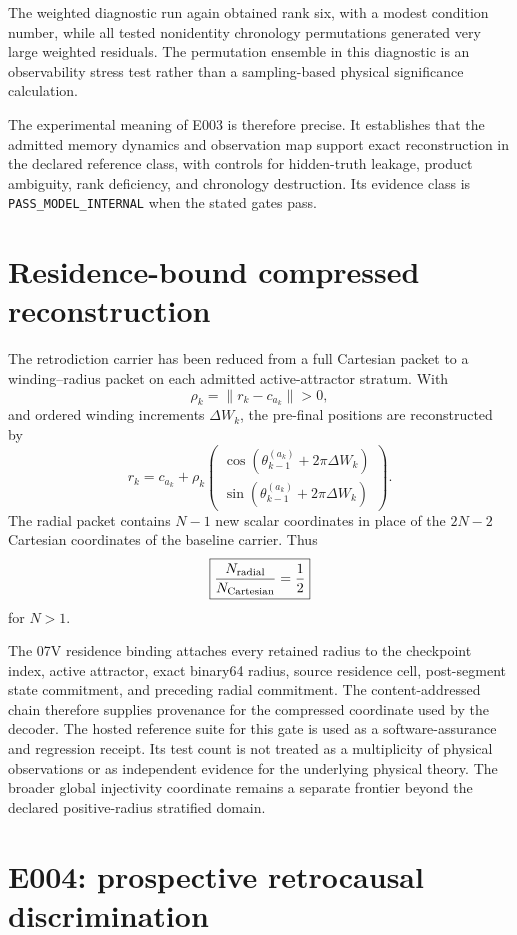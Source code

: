 \documentclass[11pt]{book}
\begin{document}
The weighted diagnostic run again obtained rank six, with a modest condition number, while all tested nonidentity chronology permutations generated very large weighted residuals. The permutation ensemble in this diagnostic is an observability stress test rather than a sampling-based physical significance calculation.

The experimental meaning of E003 is therefore precise. It establishes that the admitted memory dynamics and observation map support exact reconstruction in the declared reference class, with controls for hidden-truth leakage, product ambiguity, rank deficiency, and chronology destruction. Its evidence class is \texttt{PASS\_MODEL\_INTERNAL} when the stated gates pass.

\section{Residence-bound compressed reconstruction}

The retrodiction carrier has been reduced from a full Cartesian packet to a winding--radius packet on each admitted active-attractor stratum. With
\[
\rho_k=\|r_k-c_{a_k}\|>0,
\]
and ordered winding increments \(\Delta W_k\), the pre-final positions are reconstructed by
\[
r_k=c_{a_k}+\rho_k
\begin{pmatrix}
\cos(\theta_{k-1}^{(a_k)}+2\pi\Delta W_k)\\
\sin(\theta_{k-1}^{(a_k)}+2\pi\Delta W_k)
\end{pmatrix}.
\]
The radial packet contains \(N-1\) new scalar coordinates in place of the \(2N-2\) Cartesian coordinates of the baseline carrier. Thus
\[
\boxed{
\frac{N_{\rm radial}}{N_{\rm Cartesian}}=\frac12
}
\]
for \(N>1\).

The 07V residence binding attaches every retained radius to the checkpoint index, active attractor, exact binary64 radius, source residence cell, post-segment state commitment, and preceding radial commitment. The content-addressed chain therefore supplies provenance for the compressed coordinate used by the decoder. The hosted reference suite for this gate is used as a software-assurance and regression receipt. Its test count is not treated as a multiplicity of physical observations or as independent evidence for the underlying physical theory. The broader global injectivity coordinate remains a separate frontier beyond the declared positive-radius stratified domain.

\section{E004: prospective retrocausal discrimination}
\end{document}
